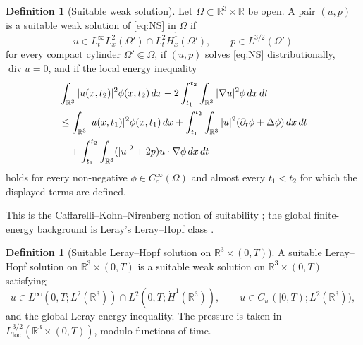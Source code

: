 \documentclass[11pt]{amsart}
\theoremstyle{plain}
\theoremstyle{definition}
\newtheorem{definition}[theorem]{Definition}
\theoremstyle{remark}
\numberwithin{equation}{section}
\newcommand{\R}{\mathbb R}
\newcommand{\loc}{\mathrm{loc}}
\newcommand{\divergence}{\operatorname{div}}
\begin{document}
\begin{definition}[Suitable weak solution]\label{def:suitable}
Let \(\Omega\subset\R^3\times\R\) be open.  A pair \((u,p)\) is a suitable
weak solution of \eqref{eq:NS} in \(\Omega\) if
\[
   u\in L^\infty_tL^2_x(\Omega')\cap L^2_t\dot H^1_x(\Omega'),
   \qquad
   p\in L^{3/2}(\Omega')
\]
for every compact cylinder \(\Omega'\Subset\Omega\), if \((u,p)\) solves
\eqref{eq:NS} distributionally, \(\divergence u=0\), and if the local energy
inequality
\begin{align}\label{eq:lei}
   &\int_{\R^3}|u(x,t_2)|^2\phi(x,t_2)\,dx
   +2\int_{t_1}^{t_2}\int_{\R^3}|\nabla u|^2\phi\,dx\,dt  \notag\\
   &\le
   \int_{\R^3}|u(x,t_1)|^2\phi(x,t_1)\,dx
   +\int_{t_1}^{t_2}\int_{\R^3}|u|^2(\partial_t\phi+\Delta\phi)\,dx\,dt
   \notag\\
   &\quad
   +\int_{t_1}^{t_2}\int_{\R^3}(|u|^2+2p)u\cdot\nabla\phi\,dx\,dt
\end{align}
holds for every non-negative \(\phi\in C_c^\infty(\Omega)\) and almost every
\(t_1<t_2\) for which the displayed terms are defined.
\end{definition}

This is the Caffarelli--Kohn--Nirenberg notion of suitability
\cite{CKN1982}; the global finite-energy background is Leray's
Leray--Hopf class \cite{Leray1934}.

\begin{definition}[Suitable Leray--Hopf solution on \(\R^3\times(0,T)\)]
\label{def:suitable-leray-hopf}
A suitable Leray--Hopf solution on \(\R^3\times(0,T)\) is a suitable weak
solution on \(\R^3\times(0,T)\) satisfying
\[
   u\in L^\infty(0,T;L^2(\R^3))
   \cap L^2(0,T;\dot H^1(\R^3)),
   \qquad
   u\in C_w([0,T);L^2(\R^3)),
\]
and the global Leray energy inequality.  The pressure is taken in
\(L^{3/2}_{\loc}(\R^3\times(0,T))\), modulo functions of time.
\end{definition}
\end{document}
